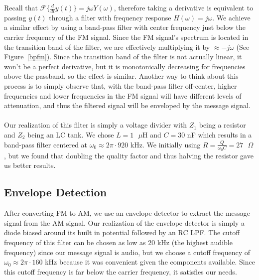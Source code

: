 \documentclass[11pt]{article}
\begin{document}
    \noindent Recall that $\mathcal{F}\{\frac{d}{dt}y(t)\} = j\omega Y(\omega)$, therefore taking a derivative is equivalent to passing $y(t)$ through a filter with frequency response $H(\omega) = j\omega$. We achieve a similar effect by using a band-pass filter with center frequency just below the carrier frequency of the FM signal. Since the FM signal's spectrum is located in the transition band of the filter, we are effectively multiplying it by $\approx -j\omega$ (See Figure~\ref{bpfm}). Since the transition band of the filter is not actually linear, it won't be a perfect derivative, but it is monotonically decreasing for frequencies above the passband, so the effect is similar. Another way to think about this process is to simply observe that, with the band-pass filter off-center, higher frequencies and lower frequencies in the FM signal will have different levels of attenuation, and thus the filtered signal will be enveloped by the message signal. \\
    \\
    Our realization of this filter is simply a voltage divider with $Z_1$ being a resistor and $Z_2$ being an LC tank. We chose $L = 1 \text{ }\mu$H and $C = 30$ nF which results in a band-pass filter centered at $\omega_0 \approx 2\pi\cdot 920$ kHz. We initially using $R = \frac{Q}{\omega_0 C} = 27 \text{ }\Omega$, but we found that doubling the quality factor and thus halving the resistor gave us better results.

    \subsection{Envelope Detection}
    After converting FM to AM, we use an envelope detector to extract the message signal from the AM signal. Our realization of the envelope detector is simply a diode biased around its built in potential followed by an RC LPF. The cutoff frequency of this filter can be chosen as low as 20 kHz (the highest audible frequency) since our message signal is audio, but we choose a cutoff frequency of $\omega_0 \approx 2\pi\cdot 160$ kHz because it was convenient given the components available. Since this cutoff frequency is far below the carrier frequency, it satisfies our needs.
\end{document}
